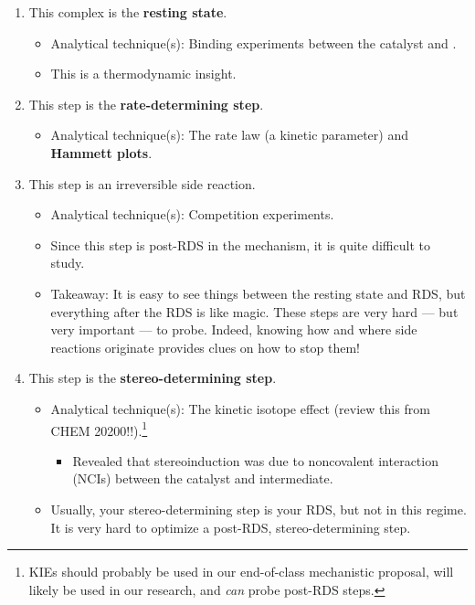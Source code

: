 \documentclass[../notes.tex]{subfiles}
\begin{document}
\begin{itemize}
\begin{enumerate}
\begin{itemize}
\begin{enumerate}[label={(\arabic*)}]
                \item This complex is the \textbf{resting state}.
                \begin{itemize}
                    \item Analytical technique(s): Binding experiments between the catalyst and .
                    \item This is a thermodynamic insight.
                \end{itemize}
                \item This step is the \textbf{rate-determining step}.
                \begin{itemize}
                    \item Analytical technique(s): The rate law (a kinetic parameter) and \textbf{Hammett plots}.
                \end{itemize}
                \item This step is an irreversible side reaction.
                \begin{itemize}
                    \item Analytical technique(s): Competition experiments.
                    \item Since this step is post-RDS in the mechanism, it is quite difficult to study.
                    \item Takeaway: It is easy to see things between the resting state and RDS, but everything after the RDS is like magic. These steps are very hard --- but very important --- to probe. Indeed, knowing how and where side reactions originate provides clues on how to stop them!
                \end{itemize}
                \item This step is the \textbf{stereo-determining step}.
                \begin{itemize}
                    \item Analytical technique(s): The kinetic isotope effect (review this from CHEM 20200!!).\footnote{KIEs should probably be used in our end-of-class mechanistic proposal, will likely be used in our research, and \emph{can} probe post-RDS steps.}
                    \begin{itemize}
                        \item Revealed that stereoinduction was due to noncovalent interaction (NCIs) between the catalyst and intermediate.
                    \end{itemize}
                    \item Usually, your stereo-determining step is your RDS, but not in this regime. It is very hard to optimize a post-RDS, stereo-determining step.

\end{itemize}
\end{enumerate}
\end{itemize}
\end{enumerate}
\end{itemize}
\end{document}

